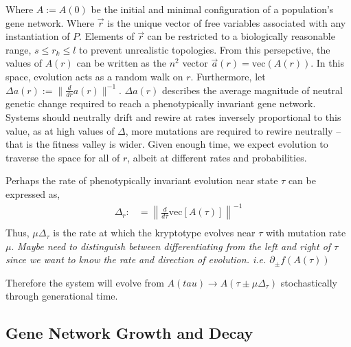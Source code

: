 \documentclass[11 pt]{article}
\newcommand{\jss}[1]{{\color{olive}\it #1}}
\newcommand{\1}{\mathbbm{1}}
\begin{document}
      Where $A := A(0)$ be the initial and minimal configuration of a population's gene network.
      Where $\vec{r}$ is the unique vector of free variables associated with any instantiation of $P$.
      Elements of $\vec{r}$  can be restricted to a biologically reasonable range, $s \leq r_{k} \leq l$ to prevent unrealistic topologies.
      From this persepctive, the values of $A(r)$ can be written as the $n^{2}$ vector $\vec{a}(r) = \text{vec}(A(r))$. In this space, evolution acts as a random walk on $r$. 
      Furthermore, let $\Delta a(r) := \lVert \frac{d}{dr} a(r) \rVert^{-1}$. $\Delta a(r)$ describes the average magnitude of neutral genetic change required to reach a phenotypically invariant gene network. Systems should neutrally drift and rewire at rates inversely proportional to this value, as at high values of $\Delta$, more mutations are required to rewire neutrally -- that is the fitness valley is wider. Given enough time, we expect evolution to traverse the space for all of $r$, albeit at different rates and probabilities.

      Perhaps the rate of phenotypically invariant evolution near state $\tau$ can be expressed as,
      \begin{align*}
        \Delta_{r} :&= \left\lVert \frac{d}{d \tau} \text{vec}\left[A(\tau)\right] \right\rVert^{-1} \\
      \end{align*}
      Thus, $\mu \Delta_{\tau}$ is the rate at which the kryptotype evolves near $\tau$ with mutation rate $\mu$.
      \jss{Maybe need to distinguish between differentiating from the left and right of $\tau$ since we want to know the rate and direction of evolution. i.e. $\partial_{\pm} f(A(\tau))$}

      Therefore the system will evolve from $A(tau) \rightarrow A(\tau \pm \mu \Delta_{\tau})$ stochastically through generational time.

      \subsection{Gene Network Growth and Decay}
\end{document}
